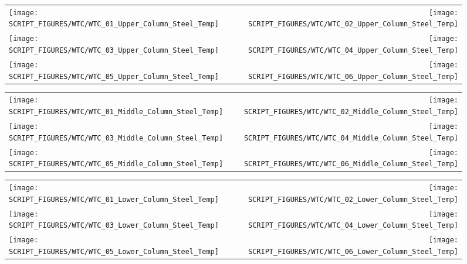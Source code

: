 \begin{figure}[!ht]
\begin{tabular*}{\textwidth}{l@{\extracolsep{\fill}}r}
\texttt{[image: SCRIPT\_FIGURES/WTC/WTC\_01\_Upper\_Column\_Steel\_Temp]} &
\texttt{[image: SCRIPT\_FIGURES/WTC/WTC\_02\_Upper\_Column\_Steel\_Temp]} \\
\texttt{[image: SCRIPT\_FIGURES/WTC/WTC\_03\_Upper\_Column\_Steel\_Temp]} &
\texttt{[image: SCRIPT\_FIGURES/WTC/WTC\_04\_Upper\_Column\_Steel\_Temp]} \\
\texttt{[image: SCRIPT\_FIGURES/WTC/WTC\_05\_Upper\_Column\_Steel\_Temp]} &
\texttt{[image: SCRIPT\_FIGURES/WTC/WTC\_06\_Upper\_Column\_Steel\_Temp]}
\end{tabular*}
\label{NIST_WTC_Upper_Column_Steel}
\end{figure}

\begin{figure}[!ht]
\begin{tabular*}{\textwidth}{l@{\extracolsep{\fill}}r}
\texttt{[image: SCRIPT\_FIGURES/WTC/WTC\_01\_Middle\_Column\_Steel\_Temp]} &
\texttt{[image: SCRIPT\_FIGURES/WTC/WTC\_02\_Middle\_Column\_Steel\_Temp]} \\
\texttt{[image: SCRIPT\_FIGURES/WTC/WTC\_03\_Middle\_Column\_Steel\_Temp]} &
\texttt{[image: SCRIPT\_FIGURES/WTC/WTC\_04\_Middle\_Column\_Steel\_Temp]} \\
\texttt{[image: SCRIPT\_FIGURES/WTC/WTC\_05\_Middle\_Column\_Steel\_Temp]} &
\texttt{[image: SCRIPT\_FIGURES/WTC/WTC\_06\_Middle\_Column\_Steel\_Temp]}
\end{tabular*}
\label{NIST_WTC_Middle_Column_Steel}
\end{figure}

\begin{figure}[!ht]
\begin{tabular*}{\textwidth}{l@{\extracolsep{\fill}}r}
\texttt{[image: SCRIPT\_FIGURES/WTC/WTC\_01\_Lower\_Column\_Steel\_Temp]} &
\texttt{[image: SCRIPT\_FIGURES/WTC/WTC\_02\_Lower\_Column\_Steel\_Temp]} \\
\texttt{[image: SCRIPT\_FIGURES/WTC/WTC\_03\_Lower\_Column\_Steel\_Temp]} &
\texttt{[image: SCRIPT\_FIGURES/WTC/WTC\_04\_Lower\_Column\_Steel\_Temp]} \\
\texttt{[image: SCRIPT\_FIGURES/WTC/WTC\_05\_Lower\_Column\_Steel\_Temp]} &
\texttt{[image: SCRIPT\_FIGURES/WTC/WTC\_06\_Lower\_Column\_Steel\_Temp]}
\end{tabular*}
\label{NIST_WTC_Lower_Column_Steel}
\end{figure}

